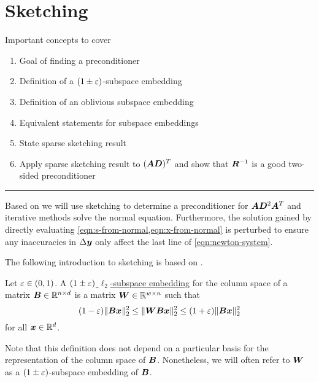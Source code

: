 \chapter{Sketching}

Important concepts to cover
\begin{enumerate}
  \item Goal of finding a preconditioner
  \item Definition of a \((1\pm\varepsilon)\)-subspace embedding
  \item Definition of an oblivious subspace embedding
  \item Equivalent statements for subspace embeddings
  \item State sparse sketching result
  \item Apply sparse sketching result to \((\bm{A}\bm{D})^T\) and show that \(\bm{R}^{-1}\) is a good two-sided preconditioner
\end{enumerate}

\hrule

Based on \cite{Avron-FasterRandomizedInfeasibleIPMs} we will use sketching to determine a preconditioner for \(\bm{A} \bm{D}^2 \bm{A}^T\) and iterative methods solve the normal equation. Furthermore, the solution gained by directly evaluating \cref{eqn:s-from-normal,eqn:x-from-normal} is perturbed to ensure any inaccuracies in \(\Delta\bm{y}\) only affect the last line of \cref{eqn:newton-system}.

The following introduction to sketching is based on \cite{Woodruff-Sketching}.

\begin{definition} \label{def:subspace-embedding}
Let \(\varepsilon \in (0, 1)\). A \uline{\((1 \pm \varepsilon)\) \(\ell_2\)-subspace embedding} for the column space of a matrix \(\bm{B} \in \mathbb{R}^{n \times d}\) is a matrix \(\bm{W} \in \mathbb{R}^{w \times n}\) such that
\[ (1-\varepsilon) \lVert \bm{B}\bm{x} \rVert_2^2 \leq \lVert \bm{W}\bm{B}\bm{x} \rVert_2^2 \leq (1+\varepsilon)\lVert \bm{B}\bm{x} \rVert_2^2 \]
for all \(\bm{x} \in \mathbb{R}^d\).
\end{definition}
Note that this definition does not depend on a particular basis for the representation of the column space of \(\bm{B}\).
Nonetheless, we will often refer to \(\bm{W}\) as a \((1\pm\varepsilon)\)-subspace embedding of \(\bm{B}\).

